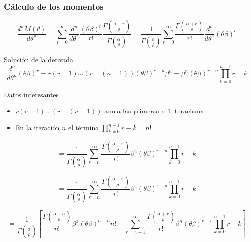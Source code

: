 \begin{frame}
    \frametitle{Cálculo de los momentos}

    \begin{equation*}
        \frac{d^n M(\theta)}{d \theta^n}
        =  \sum_{r=0}^{\infty} \frac{d^n}{d\theta^n} \frac{(\theta \beta)^r}{r!}
           \frac{\Gamma \left (\frac{\alpha+r}{\rho} \right)}{\Gamma \left ( \frac{\alpha}{\rho} \right)}
        = \frac{1}{{\Gamma \left ( \frac{\alpha}{\rho} \right)}} \sum_{r=0}^{\infty} \frac{\Gamma \left (\frac{\alpha+r}{\rho} \right)}{r!}
          \frac{d^n}{d\theta^n} (\theta \beta)^r
    \end{equation*}

    \begin{block}{Solución de la derivada}
    \setlength\abovedisplayskip{0pt}
    \begin{equation*}
        \frac{d^n}{d\theta^n} (\theta \beta)^r = r(r-1)...(r-(n-1)) (\theta \beta)^{r-n} \beta^{n} = \beta^{n} (\theta \beta)^{r-n} \prod_{k=0}^{n-1} r-k
    \end{equation*}
    \end{block}

    \begin{block}{Datos interesantes}
        \begin{itemize}
            \item $r(r-1)...(r-(n-1))$ anula las primeras n-1 iteraciones
            \item En la iteración $n$ el término $\prod_{k=0}^{n-1} r-k = n!$
        \end{itemize}
    \end{block}
\end{frame}

\begin{frame}
    \begin{equation*}
        = \frac{1}{{\Gamma \left ( \frac{\alpha}{\rho} \right)}} \sum_{r=n}^{\infty} \frac{\Gamma \left (\frac{\alpha+r}{\rho} \right)}{r!}
          \beta^{n} (\theta \beta)^{r-n} \prod_{k=0}^{n-1} r-k
    \end{equation*}
\end{frame}

\begin{frame}
    \begin{equation*}
        = \frac{1}{{\Gamma \left ( \frac{\alpha}{\rho} \right)}} \sum_{r=n}^{\infty} \frac{\Gamma \left (\frac{\alpha+r}{\rho} \right)}{r!}
          \beta^{n} (\theta \beta)^{r-n} \prod_{k=0}^{n-1} r-k
    \end{equation*}

    \begin{equation*}
        = \frac{1}{{\Gamma \left ( \frac{\alpha}{\rho} \right)}} \left
          [ \frac{\Gamma \left (\frac{\alpha+n}{\rho} \right)}{n!} \beta^n (\theta \beta)^{n-n} n! +
            \sum_{r=n+1}^{\infty} \frac{\Gamma \left (\frac{\alpha+r}{\rho} \right)}{r!} \beta^{n} (\theta \beta)^{r-n} \prod_{k=0}^{n-1} r-k \right ]
    \end{equation*}
\end{frame}


